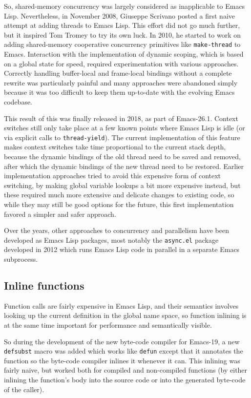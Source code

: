 \documentclass[format=acmsmall, review]{acmart}
\newcommand \Elisp {Emacs Lisp}
\begin{document}
So, shared-memory concurrency was largely considered as inapplicable to
\Elisp{}.  Nevertheless, in November 2008, Giuseppe Scrivano posted a first
naive attempt at adding threads to \Elisp{}.  This effort did not go much
further, but it inspired Tom Tromey to try its own luck.
In 2010, he started to work on adding shared-memory cooperative concurrency
primitives like \texttt{make-thread} to Emacs.  Interaction with the
implementation of dynamic scoping, which is based on a global state for
speed, required experimentation with various approaches.  Correctly handling
buffer-local and frame-local bindings without a complete rewrite was
particularly painful and many approaches were abandoned simply because it
was too difficult to keep them up-to-date with the evolving Emacs codebase.

This result of this was finally released in 2018, as part of Emacs-26.1.
Context switches still only take place at a few known points where \Elisp{}
is idle (or via explicit calls to \texttt{thread-yield}).  The current
implementation of this feature makes context switches take time proportional
to the current stack depth, because the dynamic bindings of the old thread
need to be saved and removed, after which the dynamic bindings of the new
thread need to be restored.  Earlier implementation approaches tried to
avoid this expensive form of context switching, by making global variable
lookups a bit more expensive instead, but these required much more extensive
and delicate changes to existing code, so while they may still be good
options for the future, this first implementation favored a simpler and
safer approach.

Over the years, other approaches to concurrency and parallelism have been
developed as \Elisp{} packages, most notably the \texttt{async.el}
package~\cite{WiegleyAsync2019}
developed in 2012 which runs \Elisp{} code in parallel in a separate
Emacs subprocess.

\subsection{Inline functions}
\label{sec:inline-functions}

Function calls are fairly expensive in \Elisp{}, and their semantics
involves looking up the current definition in the global name space, so
function inlining is at the same time important for performance and
semantically visible.

So during the development of the new byte-code compiler for Emacs-19, a new
\texttt{defsubst} macro was added which works like \texttt{defun} except
that it annotates the function so the byte-code compiler inlines it whenever it
can.  This inlining was fairly naive, but worked both for compiled and
non-compiled functions (by either inlining the function's body into the
source code or into the generated byte-code of the caller).
\end{document}
